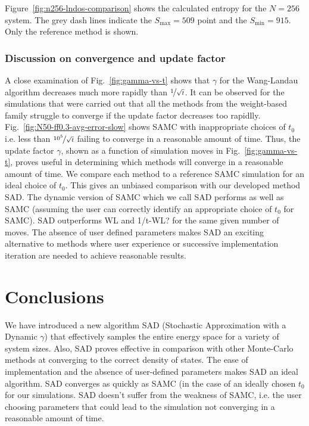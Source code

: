 \documentclass[letterpaper,twocolumn,amsmath,amssymb,pre,aps,10pt]{revtex4-1}
\begin{document}
{\color{red}
Figure~\ref{fig:n256-lndos-comparison} shows the calculated entropy for
the $N = 256$ system. The grey dash lines indicate the $S_{\max} = 509$
point and the $S_{\min} = 915$. Only the reference method is shown.
}

\subsubsection{Discussion on convergence and update factor}

A close examination of Fig.~\ref{fig:gamma-vs-t} shows that $\gamma$
for the Wang-Landau algorithm decreases much more rapidly than
$\nicefrac{1}{\sqrt{t}}$. It can be observed  for the simulations that
were carried out that all the methods from the weight-based family
struggle to converge if the update factor decreases too rapidlly.
Fig.~\ref{fig:N50-ff0.3-avg-error-slow} shows SAMC with inappropriate choices
of $t_0$ i.e. less than $\nicefrac{10^5}{\sqrt{t}}$ failing to converge
in a reasonable amount of time. Thus, the update factor $\gamma$, shown
as a function of simulation moves in Fig.~\ref{fig:gamma-vs-t}, proves
useful in determining which methods will converge in a reasonable
amount of time. We compare each method to a reference SAMC
simulation for an ideal choice of $t_0$.  This gives an unbiased
comparison with our developed method SAD. The dynamic version of SAMC
which we call SAD performs as well as SAMC (assuming the user can
correctly identify an appropriate choice of $t_0$ for SAMC).  SAD
outperforms WL and 1/t-WL? for the same given number of moves. The
absence of user defined parameters makes SAD an exciting alternative to
methods where user experience or successive implementation iteration
are needed to achieve reasonable results.

\section{Conclusions}

We have introduced a new algorithm SAD (Stochastic Approximation with a
Dynamic $\gamma$) that effectively samples the entire energy space for
a variety of system sizes.  Also, SAD proves effective in comparison
with other Monte-Carlo methods at converging to the correct density of
states.  The ease of implementation and the absence of user-defined
parameters makes SAD an ideal algorithm. SAD converges as quickly as
SAMC (in the case of an ideally chosen $t_0$ for our simulations. SAD
doesn't suffer from the weakness of SAMC, i.e. the user choosing
parameters that could lead to the simulation not converging in a
reasonable amount of time.
\end{document}
